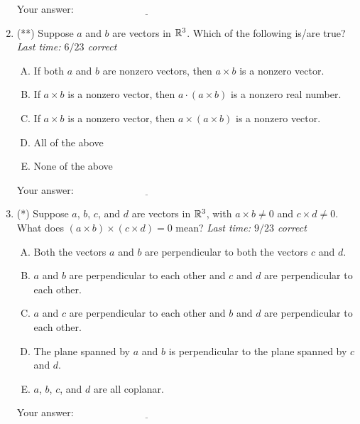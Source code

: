 \documentclass[10pt]{amsart}
\begin{document}
\begin{enumerate}
  \vspace{0.1in}
  Your answer: $\underline{\qquad\qquad\qquad\qquad\qquad\qquad\qquad}$
  \vspace{0.6in}

\item (**) Suppose $a$ and $b$ are vectors in $\mathbb{R}^3$. Which of the
  following is/are true? {\em Last time: $6/23$ correct}

  \begin{enumerate}[(A)]
  \item If both $a$ and $b$ are nonzero vectors, then $a \times b$ is
    a nonzero vector.
  \item If $a \times b$ is a nonzero vector, then $a \cdot (a \times
    b)$ is a nonzero real number.
  \item If $a \times b$ is a nonzero vector, then $a \times (a \times
    b)$ is a nonzero vector.
  \item All of the above
  \item None of the above
  \end{enumerate}

  \vspace{0.1in}
  Your answer: $\underline{\qquad\qquad\qquad\qquad\qquad\qquad\qquad}$
  \vspace{0.6in}

\item (*) Suppose $a$, $b$, $c$, and $d$ are vectors in $\mathbb{R}^3$, with
  $a \times b \ne 0$ and $c \times d \ne 0$. What does $(a \times b)
  \times (c \times d) = 0$ mean? {\em Last time: $9/23$ correct}

  \begin{enumerate}[(A)]
  \item Both the vectors $a$ and $b$ are perpendicular to both the
    vectors $c$ and $d$.
  \item $a$ and $b$ are perpendicular to each other and $c$ and $d$
    are perpendicular to each other.
  \item $a$ and $c$ are perpendicular to each other and $b$ and $d$
    are perpendicular to each other.
  \item The plane spanned by $a$ and $b$ is perpendicular to the plane
    spanned by $c$ and $d$.
  \item $a$, $b$, $c$, and $d$ are all coplanar.
  \end{enumerate}

  \vspace{0.1in}
  Your answer: $\underline{\qquad\qquad\qquad\qquad\qquad\qquad\qquad}$
  \vspace{0.6in}


\end{enumerate}
\end{document}
